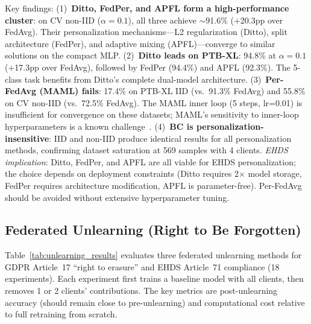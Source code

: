 \documentclass[conference]{IEEEtran}
\begin{document}
\begin{table}[htbp]
\vspace{1mm}
\footnotesize{Key findings: (1)~\textbf{Ditto, FedPer, and APFL form a high-performance cluster}: on CV non-IID ($\alpha{=}0.1$), all three achieve $\sim$91.6\% ($+$20.3pp over FedAvg). Their personalization mechanisms---L2 regularization (Ditto), split architecture (FedPer), and adaptive mixing (APFL)---converge to similar solutions on the compact MLP. (2)~\textbf{Ditto leads on PTB-XL}: 94.8\% at $\alpha{=}0.1$ ($+$17.3pp over FedAvg), followed by FedPer (94.4\%) and APFL (92.3\%). The 5-class task benefits from Ditto's complete dual-model architecture. (3)~\textbf{Per-FedAvg (MAML) fails}: 17.4\% on PTB-XL IID (vs.\ 91.3\% FedAvg) and 55.8\% on CV non-IID (vs.\ 72.5\% FedAvg). The MAML inner loop (5 steps, lr=0.01) is insufficient for convergence on these datasets; MAML's sensitivity to inner-loop hyperparameters is a known challenge~\cite{fallah2020personalized}. (4)~\textbf{BC is personalization-insensitive}: IID and non-IID produce identical results for all personalization methods, confirming dataset saturation at 569 samples with 4 clients. \textit{EHDS implication}: Ditto, FedPer, and APFL are all viable for EHDS personalization; the choice depends on deployment constraints (Ditto requires 2$\times$ model storage, FedPer requires architecture modification, APFL is parameter-free). Per-FedAvg should be avoided without extensive hyperparameter tuning.}
\end{table}

\subsection{Federated Unlearning (Right to Be Forgotten)}
\label{sec:unlearning_exp}

Table~\ref{tab:unlearning_results} evaluates three federated unlearning methods for GDPR Article~17 ``right to erasure'' and EHDS Article~71 compliance (18 experiments). Each experiment first trains a baseline model with all clients, then removes 1 or 2 clients' contributions. The key metrics are post-unlearning accuracy (should remain close to pre-unlearning) and computational cost relative to full retraining from scratch.
\end{document}
